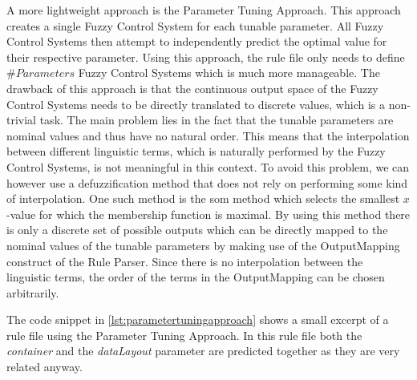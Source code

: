 A more lightweight approach is the Parameter Tuning Approach. This approach creates a single Fuzzy Control System for each tunable parameter. All Fuzzy Control Systems then attempt to independently predict the optimal value for their respective parameter. Using this approach, the rule file only needs to define $\#Parameters$ Fuzzy Control Systems which is much more manageable. The drawback of this approach is that the continuous output space of the Fuzzy Control Systems needs to be directly translated to discrete values, which is a non-trivial task. The main problem lies in the fact that the tunable parameters are nominal values and thus have no natural order. This means that the interpolation between different linguistic terms, which is naturally performed by the Fuzzy Control Systems, is not meaningful in this context. To avoid this problem, we can however use a defuzzification method that does not rely on performing some kind of interpolation. One such method is the \gls{som} method which selects the smallest $x$-value for which the membership function is maximal. By using this method there is only a discrete set of possible outputs which can be directly mapped to the nominal values of the tunable parameters by making use of the OutputMapping construct of the Rule Parser. Since there is no interpolation between the linguistic terms, the order of the terms in the OutputMapping can be chosen arbitrarily.


The code snippet in \autoref{lst:parametertuningapproach} shows a small excerpt of a rule file using the Parameter Tuning Approach. In this rule file both the \emph{container} and the \emph{dataLayout} parameter are predicted together as they are very related anyway.


